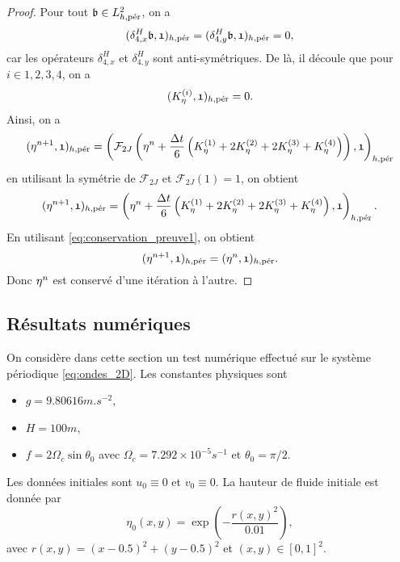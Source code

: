 \begin{proof}
Pour tout $\mathfrak{b} \in L^2_{h,\per}$, on a 
\begin{equation}
(\delta_{4,x}^H \mathfrak{b}, \mathfrak{1})_{h,\per} = (\delta_{4,y}^H \mathfrak{b}, \mathfrak{1})_{h,\per} = 0,
\end{equation}
car les opérateurs $\delta_{4,x}^H$ et $\delta_{4,y}^H$ sont anti-symétriques. De là, il découle que pour $i \in {1,2,3,4}$, on a 
\begin{equation}
(K_{\eta}^{(i)}, \mathfrak{1})_{h,\per} = 0.
\label{eq:conservation_preuve1}
\end{equation}
Ainsi, on a
\begin{equation}
(\etafrak^{n+1}, \mathfrak{1})_{h,\per} = \left( \mathcal{F}_{2J}\left( \etafrak^n  + \dfrac{\Delta t}{6} \left( K^{(1)}_{\eta} + 2 K^{(2)}_{\eta} + 2 K^{(3)}_{\eta} + K^{(4)}_{\eta} \right) \right) , \mathfrak{1} \right)_{h,\per}
\end{equation}
en utilisant la symétrie de $\mathcal{F}_{2J}$ et $\mathcal{F}_{2J}(\mathfrak{1}) = \mathfrak{1}$, on obtient
\begin{equation}
(\etafrak^{n+1}, \mathfrak{1})_{h,\per} = \left( \etafrak^n  + \dfrac{\Delta t}{6} \left( K^{(1)}_{\eta} + 2 K^{(2)}_{\eta} + 2 K^{(3)}_{\eta} + K^{(4)}_{\eta} \right) , \mathfrak{1}\right)_{h,\per}.
\end{equation}
En utilisant \eqref{eq:conservation_preuve1}, on obtient
\begin{equation}
(\etafrak^{n+1} , \mathfrak{1})_{h,\per} = (\etafrak^{n} , \mathfrak{1})_{h,\per}.
\end{equation}
Donc $\etafrak^n$ est conservé d'une itération à l'autre.
\end{proof}









\subsection{Résultats numériques}

On considère dans cette section un test numérique effectué sur le système périodique \eqref{eq:ondes_2D}. Les constantes physiques sont
\begin{itemize}
\item $g = 9.80616 \si{m.s^{-2}}$,
\item $H=100 \si{m}$,
\item $f = 2 \Omega_c \sin \theta_0$ avec $\Omega_c = 7.292 \times 10^{-5} \si{s^{-1}}$ et $\theta_0 = \pi/2$.
\end{itemize}
Les données initiales sont $u_0 \equiv 0$ et $v_0 \equiv 0$. La hauteur de fluide initiale est donnée par
\begin{equation}
\eta_0(x,y) = \exp \left( - \dfrac{r(x,y)^2}{0.01} \right),
\label{eq:waves_test1}
\end{equation}
avec $r(x,y) = (x-0.5)^2+(y-0.5)^2$ et $(x,y) \in [0,1]^2$.

